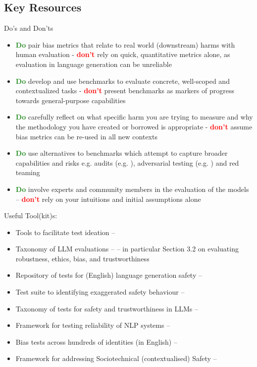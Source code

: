 \subsection{Key Resources}
Do's and Don'ts
\begin{itemize}
    \item \textcolor{ForestGreen}{\textbf{Do}} pair bias metrics that relate to real world (downstream) harms with human evaluation - \textcolor{red}{\textbf{don't}} rely on quick, quantitative metrics alone, as evaluation in language generation can be unreliable

    \item \textcolor{ForestGreen}{\textbf{Do}} develop and use benchmarks to evaluate concrete, well-scoped and contextualized tasks - \textcolor{red}{\textbf{don't}} present benchmarks as markers of progress towards general-purpose capabilities  

    \item \textcolor{ForestGreen}{\textbf{Do}} carefully reflect on what specific harm you are trying to measure and why the methodology you have created or borrowed is appropriate - \textcolor{red}{\textbf{don't}} assume bias metrics can be re-used in all new contexts

     \item \textcolor{ForestGreen}{\textbf{Do}} use alternatives to benchmarks which attempt to capture broader capabilities and risks e.g. audits (e.g. \citet{buolamwini_gender_2018}), adversarial testing (e.g. \citet{niven-kao-2019-probing}) and red teaming~\citep{ganguli_red_2022}
    
    \item \textcolor{ForestGreen}{\textbf{Do}} involve experts and community members in the evaluation of the models -- \textcolor{red}{\textbf{don't}} rely on your intuitions and initial assumptions alone
    
\end{itemize}

\noindent Useful Tool(kit)s: 
\begin{itemize}
    \item Tools to facilitate test ideation -- \citet{ribeiro_beyond_2020}
    \item Taxonomy of LLM
evaluations -- \citet{chang_survey_2023} -- in particular Section 3.2 on evaluating robustness, ethics, bias, and trustworthiness
\item Repository of tests for (English) language generation safety -- \citet{dinan_safetykit_2022}
    \item Test suite to identifying exaggerated safety behaviour -- \citet{rottger_xstest_2024}
    \item Taxonomy of tests for safety and trustworthiness in LLMs -- \citet{huang_survey_2023} 
    \item Framework for testing reliability of NLP systems -- \citet{tan_reliability_2021}
    \item Bias tests across hundreds of identities (in English) -- \citet{smith_im_2022}
    \item Framework for addressing Sociotechnical (contextualised) Safety -- \citet{weidinger2023sociotechnical}
\end{itemize}